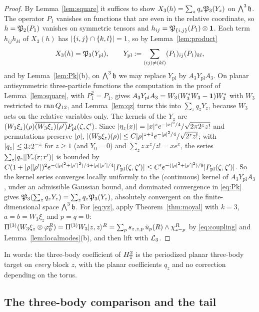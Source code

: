 \begin{proof}
By Lemma~\ref{lem:square} it suffices to show $X_3(h)=\sum_zq_z\mathfrak{P}_3(Y_z)$ on $\bigwedge^3\mathfrak{h}$. The operator $P_1$ vanishes on functions that
are even in the relative coordinate, so $h=\mathfrak{P}_2(P_1)$ vanishes on symmetric tensors and $h_{ij}=\mathfrak{P}_{\{i,j\}}(P_1)\otimes\mathbf{1}$. Each term
$h_{ij}h_{kl}$ of $X_3(h)$ has $\lvert\{i,j\}\cap\{k,l\}\rvert=1$, so by Lemma~\ref{lem:product}
\[
X_3(h)=\mathfrak{P}_3(Y_{\mathrm{pl}}),\qquad Y_{\mathrm{pl}}:=\sum_{(ij)\neq(kl)}(P_1)_{ij}(P_1)_{kl},
\]
and by Lemma~\ref{lem:Pk}(b), on $\bigwedge^3\mathfrak{h}$ we may replace $Y_{\mathrm{pl}}$ by $A_3Y_{\mathrm{pl}}A_3$. On planar antisymmetric
three-particle functions the computation in the proof of Lemma~\ref{lem:square}, with $P_1^2=P_1$, gives
$A_3Y_{\mathrm{pl}}A_3=W_3(W_3^*W_3-\mathbf{1})W_3^*$ with $W_3$ restricted to $\operatorname{ran} Q_{12}$, and Lemma~\ref{lem:qz} turns this into
$\sum_zq_zY_z$, because $W_3$ acts on the relative variables only. The kernels of the $Y_z$ are
$(W_3\xi_z)(\rho)\overline{(W_3\xi_z)(\rho')}P_{\mathrm{pl}}(\zeta,\zeta')$. Since $\lvert\eta_z(x)\rvert=\lvert x\rvert^ze^{-\lvert x\rvert^2/4}/\sqrt{2\pi2^zz!}$ and permutations
preserve $\lvert\rho\rvert$, $\lvert(W_3\xi_z)(\rho)\rvert\le C\lvert\rho\rvert^{z+1}e^{-\lvert\rho\rvert^2/4}/\sqrt{2^zz!}$; with $\lvert q_z\rvert\le3z2^{-z}$ for $z\ge1$
(and $Y_0=0$) and
$\sum_zz\,x^z/z!=xe^x$, the series $\sum_z\lvert q_z\rvert\lvert Y_z(r;r')\rvert$ is bounded by
$C(1+\lvert\rho\rvert\lvert\rho'\rvert)^2e^{-(\lvert\rho\rvert^2+\lvert\rho'\rvert^2)/4+\lvert\rho\rvert\lvert\rho'\rvert/4}\lvert P_{\mathrm{pl}}(\zeta,\zeta')\rvert\le C'e^{-(\lvert\rho\rvert^2+\lvert\rho'\rvert^2)/9}\lvert P_{\mathrm{pl}}(\zeta,\zeta')\rvert$. So the kernel series
converges locally uniformly to the (continuous) kernel of $A_3Y_{\mathrm{pl}}A_3$, under an admissible Gaussian bound, and dominated
convergence in \eqref{eq:Pk} gives $\mathfrak{P}_3(\sum_zq_zY_z)=\sum_zq_z\mathfrak{P}_3(Y_z)$, absolutely convergent on the finite-dimensional space
$\bigwedge^3\mathfrak{h}$. For \eqref{eq:yz}, apply Theorem~\ref{thm:moyal} with $k=3$, $a=b=W_3\xi_z$ and $p=q=0$:
$\Pi^{(3)}(W_3\xi_z\otimes\varphi_0^R)=\Pi^{(3)}W_3\lvert z,z\rangle^R=\sum_ps_{z,z,p}\,\tilde u_p(R)\wedge\chi^R_{z-p}$ by \eqref{eq:coupling} and
Lemma~\ref{lem:localmodes}(b), and then lift with $\mathcal{L}_3$.
\end{proof}

In words: the three-body coefficient of $H_{\mathbb{T}}^2$ is the periodized planar three-body target on \emph{every} block $z$, with
the planar coefficients $q_z$ and no correction depending on the torus.

\subsection{The three-body comparison and the tail}

